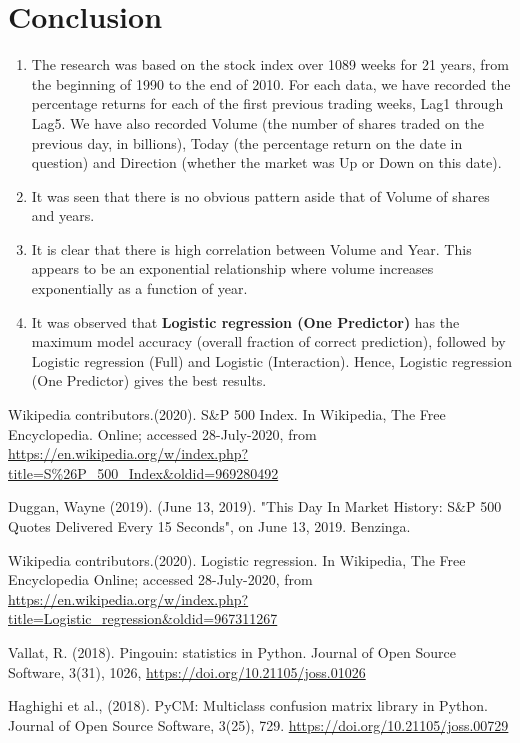 \documentclass[12pt]{article}
\begin{document}
\section{Conclusion} 
\begin{enumerate}
	\item  The research was based on the stock index over 1089 weeks for 21 years, from the beginning of 1990 to the end of 2010.  For each data,  we have recorded the percentage returns for each of the  first previous trading weeks, Lag1 through Lag5.  We have also recorded Volume (the number of shares traded on the previous day, in billions), Today (the percentage return on the date in question) and Direction (whether the market was Up or Down on this date).
	
	\item It was seen that there is no obvious pattern aside that of Volume of shares and years. 
	
	\item  It is clear that there is high correlation between Volume and Year. This appears to be an exponential relationship where volume increases exponentially as a function of year.
	
	\item It was observed that \textbf{Logistic regression (One Predictor)} has the maximum model accuracy (overall fraction of correct prediction), followed by Logistic regression (Full) and Logistic (Interaction). Hence, Logistic regression (One Predictor) gives the best results.
\end{enumerate}







\begin{thebibliography}{999}

	Wikipedia contributors.(2020). S\&P 500 Index. In Wikipedia, The Free Encyclopedia. Online; accessed 28-July-2020, from {\url{https://en.wikipedia.org/w/index.php?title=S\%26P_500_Index&oldid=969280492}}
	
	Duggan, Wayne (2019). (June 13, 2019). "This Day In Market History: S\&P 500 Quotes Delivered Every 15 Seconds", on June 13, 2019. Benzinga.
	
	Wikipedia contributors.(2020). Logistic regression. In Wikipedia, The Free Encyclopedia Online; accessed 28-July-2020, from  {\url{https://en.wikipedia.org/w/index.php?title=Logistic\_regression\&oldid=967311267}}
	
	Vallat, R. (2018). Pingouin: statistics in Python. Journal of Open Source Software, 3(31), 1026, {\url{https://doi.org/10.21105/joss.01026}}
	
	Haghighi et al., (2018). PyCM: Multiclass confusion matrix library in Python. Journal of Open Source Software, 3(25), 729.
	{\url{https://doi.org/10.21105/joss.00729}}
\end{thebibliography}
\end{document}
